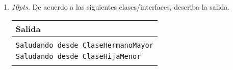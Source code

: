 \documentclass[10pt]{article}
\begin{document}
{\begin{enumerate}
\begin{multicols}{2}
		\end{multicols}
		
		\newpage

		\item \emph{10pts.} De acuerdo a las siguientes clases/interfaces, describa la salida.
		
		
		
		
		
		

        \begin{table}[H]
            \begin{center}
                \begin{tabular}{|l|}\hline 
                    Salida \\\hline 
                    \\
                    \texttt{Saludando desde ClaseHermanoMayor} \\
                    \texttt{Saludando desde ClaseHijaMenor} \\
                    \\
                    \hline 
                \end{tabular}
            \end{center}
        \end{table}

        

        \newpage


\end{enumerate}}
\end{document}
